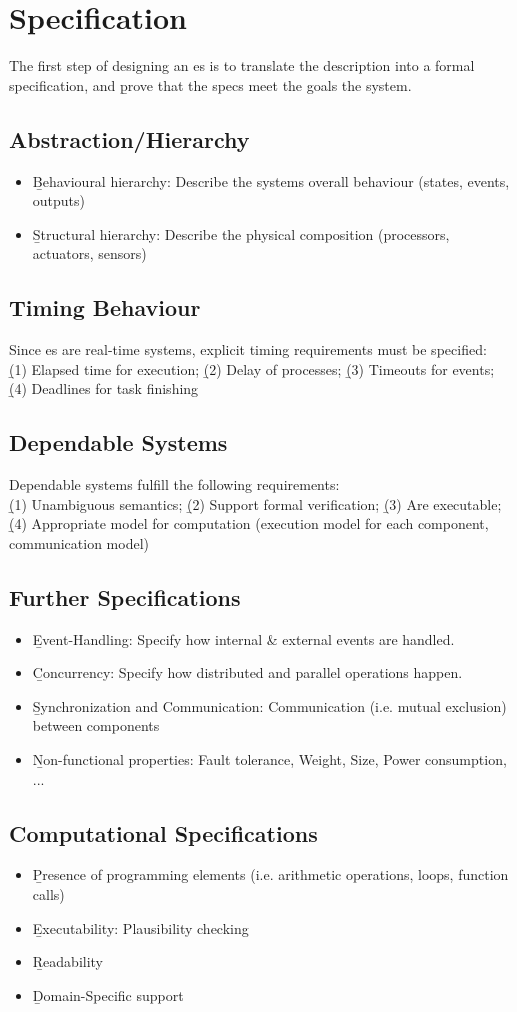 \section{Specification}
The first step of designing an \ac{es} is to translate the description into a formal specification, and \b{prove} that the specs meet the goals the system.
\subsection{Abstraction/Hierarchy}
\begin{itemize}
    \item \b{Behavioural hierarchy:} Describe the systems overall behaviour (states, events, outputs)
    \item \b{Structural hierarchy:} Describe the physical composition (processors, actuators, sensors)
\end{itemize}
\subsection{Timing Behaviour}
Since \ac{es} are real-time systems, explicit timing requirements must be specified: \\[0.5em]
\b{(1)} Elapsed time for execution; \b{(2)} Delay of processes; \b{(3)} Timeouts for events; \\
\b{(4)} Deadlines for task finishing
\subsection{Dependable Systems}
Dependable systems fulfill the following requirements: \\[0.5em]
\b{(1)} Unambiguous semantics; \b{(2)} Support formal verification; \b{(3)} Are executable; \\
\b{(4)} Appropriate model for computation (execution model for each component, communication model)
\subsection{Further Specifications}
\begin{itemize}
    \item \b{Event-Handling:} Specify how internal \& external events are handled.
    \item \b{Concurrency:} Specify how distributed and parallel operations happen.
    \item \b{Synchronization and Communication:} Communication (i.e. mutual exclusion) between components
    \item \b{Non-functional properties:} Fault tolerance, Weight, Size, Power consumption, ...
\end{itemize}
\subsection{Computational Specifications}
\begin{itemize}
    \item \b{Presence of programming elements} (i.e. arithmetic operations, loops, function calls)
    \item \b{Executability:} Plausibility checking
    \item \b{Readability}
    \item \b{Domain-Specific support}
\end{itemize}










